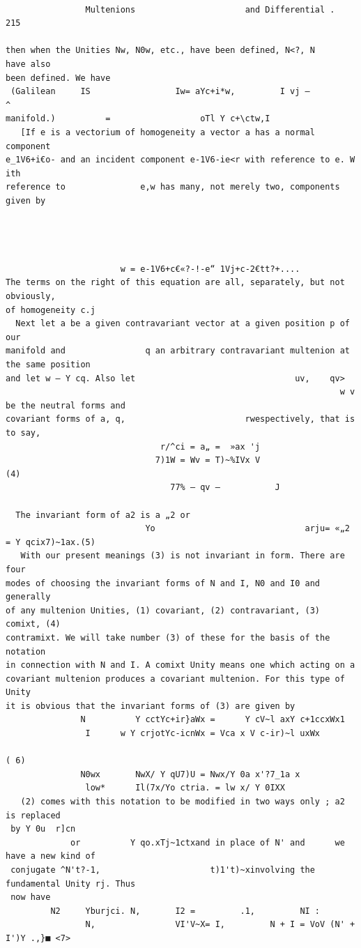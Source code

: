 \documentclass[10pt]{article}
\begin{document}
\clearpage
\begin{verbatim}

                Multenions                      and Differential .                 215

then when the Unities Nw, N0w, etc., have been defined, N<?, N               have also
been defined. We have
 (Galilean     IS                 Iw= aYc+i*w,         I vj —                  ^
manifold.)          =                  oTl Y c+\ctw,I
   [If e is a vectorium of homogeneity a vector a has a normal component
e_1V6+i€o- and an incident component e-1V6-ie<r with reference to e. W ith
reference to               e,w has many, not merely two, components given by




                       w = e-1V6+c€«?-!-e“ 1Vj+c-2€tt?+....
The terms on the right of this equation are all, separately, but not obviously,
of homogeneity c.j
  Next let a be a given contravariant vector at a given position p of our
manifold and                q an arbitrary contravariant multenion at the same position
and let w — Y cq. Also let                                uv,    qv>
                                                                   w v be the neutral forms and
covariant forms of a, q,                        rwespectively, that is to say,
                               r/^ci = a„ =  »ax 'j
                              7)1W = Wv = T)~%IVx V                                 (4)
                                 77% — qv —           J

  The invariant form of a2 is a „2 or
                            Yo                              arju= «„2 = Y qcix7)~1ax.(5)
   With our present meanings (3) is not invariant in form. There are four
modes of choosing the invariant forms of N and I, N0 and I0 and generally
of any multenion Unities, (1) covariant, (2) contravariant, (3) comixt, (4)
contramixt. We will take number (3) of these for the basis of the notation
in connection with N and I. A comixt Unity means one which acting on a
covariant multenion produces a covariant multenion. For this type of Unity
it is obvious that the invariant forms of (3) are given by
               N          Y cctYc+ir}aWx =      Y cV~l axY c+1ccxWx1
                I      w Y crjotYc-icnWx = Vca x V c-ir)~l uxWx
                                                                                    ( 6)
               N0wx       NwX/ Y qU7)U = Nwx/Y 0a x'?7_1a x
                low*      Il(7x/Yo ctria. = lw x/ Y 0IXX
   (2) comes with this notation to be modified in two ways only ; a2 is replaced
 by Y 0u  r]cn
             or          Y qo.xTj~1ctxand in place of N' and      we have a new kind of
 conjugate ^N't?-1,                      t)1't)~xinvolving the fundamental Unity rj. Thus
 now have
         N2     Yburjci. N,       I2 =         .1,         NI :
                N,                VI'V~X= I,         N + I = VoV (N' + I')Y .,}■ <7>


\end{verbatim}
\end{document}
